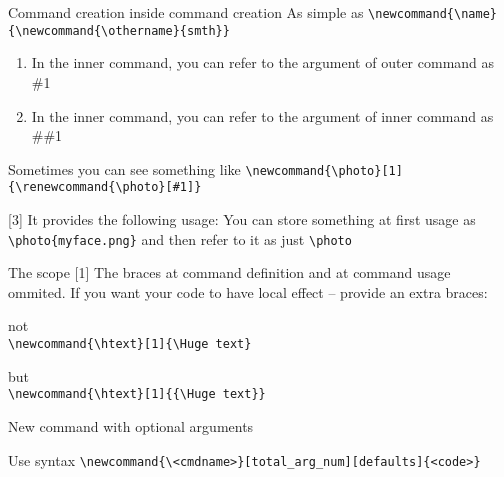 \begin{frame}[fragile]{Command creation inside command creation}\relax
    As simple as \verb|\newcommand{\name}{\newcommand{\othername}{smth}}|
    
    \begin{enumerate}
        \item In the inner command, you can refer to the argument of outer command as \#1
        \item In the inner command, you can refer to the argument of inner command as \#\#1
    \end{enumerate}
    \inpause
    Sometimes you can see something like
    \lstinline[basicstyle=\tt\small]|\newcommand{\photo}[1]{\renewcommand{\photo}[#1]}|
    
    [3] It provides the following usage: You can store something at first usage as \verb|\photo{myface.png}| and then refer to it as just \verb|\photo|
\end{frame}

\begin{frame}[fragile]{The scope\preMagicPage}\relax
     \cprotect{}[1]
     The braces at command definition and at command usage ommited. If you want your code to have local effect -- provide an extra braces:
     
     not \\  \lstinline[basicstyle=\tt]|\newcommand{\htext}[1]{\Huge text}|
     
     but \\  \lstinline[basicstyle=\tt]|\newcommand{\htext}[1]{{\Huge text}}|
\end{frame}




\begin{frame}[fragile]{New command with optional arguments\magicPage}\relax
    
    Use syntax \verb|\newcommand{\<cmdname>}[total_arg_num][defaults]{<code>}|
\end{frame}

